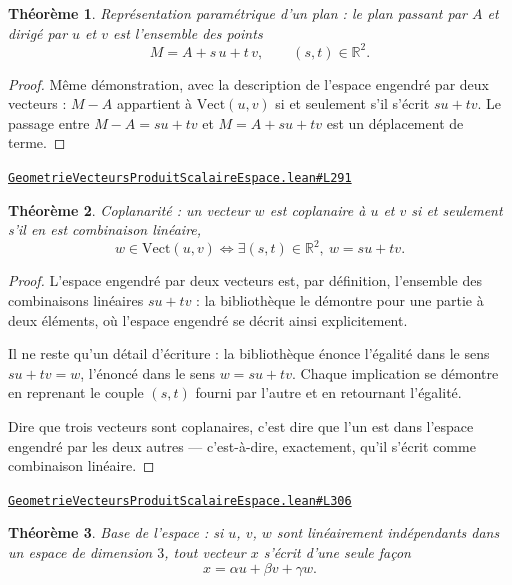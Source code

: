 \documentclass[11pt,a4paper]{article}
\theoremstyle{definition}
\theoremstyle{plain}
\newtheorem{theoreme}{Théorème}
\newcommand{\source}[2]{\par\smallskip\noindent\hfill{\footnotesize\href{#1}{\texttt{#2}}}\par\smallskip}
\begin{document}
\begin{theoreme}
Représentation paramétrique d'un plan : le plan passant par $A$ et dirigé par $u$ et $v$
est l'ensemble des points
\[ M = A + s\,u + t\,v , \qquad (s, t) \in \mathbb{R}^{2} . \]
\end{theoreme}

\begin{proof}
Même démonstration, avec la description de l'espace engendré par deux vecteurs : $M - A$
appartient à $\mathrm{Vect}(u, v)$ si et seulement s'il s'écrit $su + tv$. Le passage entre
$M - A = su + tv$ et $M = A + su + tv$ est un déplacement de terme.
\end{proof}
\source{https://github.com/Commutator-IO/learn-lean/blob/main/courses/02-lycee/08-geometrie-vecteurs-produit-scalaire-espace/GeometrieVecteursProduitScalaireEspace.lean\#L291}{GeometrieVecteursProduitScalaireEspace.lean\#L291}

\begin{theoreme}
Coplanarité : un vecteur $w$ est coplanaire à $u$ et $v$ si et seulement s'il en est
combinaison linéaire,
\[ w \in \mathrm{Vect}(u, v) \iff \exists (s, t) \in \mathbb{R}^{2},\ w = su + tv . \]
\end{theoreme}

\begin{proof}
L'espace engendré par deux vecteurs est, par définition, l'ensemble des combinaisons
linéaires $s u + t v$ : la bibliothèque le démontre pour une partie à deux éléments, où
l'espace engendré se décrit ainsi explicitement.

Il ne reste qu'un détail d'écriture : la bibliothèque énonce l'égalité dans le sens
$su + tv = w$, l'énoncé dans le sens $w = su + tv$. Chaque implication se démontre en
reprenant le couple $(s, t)$ fourni par l'autre et en retournant l'égalité.

Dire que trois vecteurs sont coplanaires, c'est dire que l'un est dans l'espace engendré par
les deux autres — c'est-à-dire, exactement, qu'il s'écrit comme combinaison linéaire.
\end{proof}
\source{https://github.com/Commutator-IO/learn-lean/blob/main/courses/02-lycee/08-geometrie-vecteurs-produit-scalaire-espace/GeometrieVecteursProduitScalaireEspace.lean\#L306}{GeometrieVecteursProduitScalaireEspace.lean\#L306}

\begin{theoreme}
Base de l'espace : si $u$, $v$, $w$ sont linéairement indépendants dans un espace de
dimension $3$, tout vecteur $x$ s'écrit d'une seule façon
\[ x = \alpha u + \beta v + \gamma w . \]
\end{theoreme}
\end{document}
